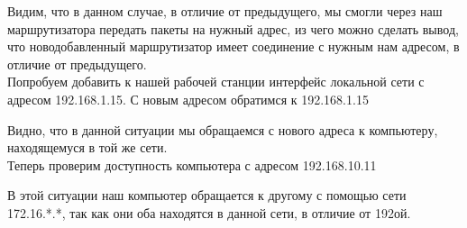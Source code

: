 \documentclass[a4paper,12pt]{article}
\begin{document}
Видим, что в данном случае, в отличие от предыдущего, мы смогли через наш маршрутизатора
передать пакеты на нужный адрес, из чего можно сделать вывод, что новодобавленный маршрутизатор 
имеет соединение с нужным нам адресом, в отличие от предыдущего.\\

Попробуем добавить к нашей рабочей станции интерфейс локальной сети
с адресом 192.168.1.15. С новым адресом обратимся к 192.168.1.15
\begin{figure}[H]
\end{figure}
Видно, что в данной ситуации мы обращаемся с нового адреса к компьютеру, 
находящемуся в той же сети.\\
Теперь проверим доступность компьютера с адресом 192.168.10.11
\begin{figure}[H]
\end{figure}
В этой ситуации наш компьютер обращается к другому с помощью сети 172.16.*.*, так
как они оба находятся в данной сети, в отличие от 192ой.
\end{document}
